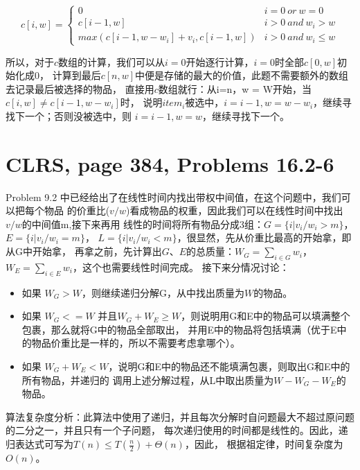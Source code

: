 \documentclass{article}
\begin{document}
\begin{CJK}{UTF8}{gbsn}
\begin{displaymath}
c[i,w] = \left \{ \begin{array}{ll}
                          0 	&i=0 \ or \ w = 0\\
                          c[i-1,w] 		& i > 0 \ and \ w_i > w\\
                          max(c[i-1,w-w_i]+v_i, c[i-1,w]) 	& i > 0 \ and \ w_i \leq w
                  \end{array} \right.
\end{displaymath}

所以，对于$c$数组的计算，我们可以从$i=0$开始逐行计算，$i=0$时全部$c[0,w]$初始化成0，
计算到最后$c[n,w]$中便是存储的最大的价值，此题不需要额外的数组去记录最后被选择的物品，
直接用$c$数组就行：从i=n，w = W开始，当$c[i,w] \neq c[i-1, w - w_i]$时，
说明$item_i$被选中，$i = i-1, w = w-w_i$，继续寻找下一个；否则没被选中，则
$i = i-1, w = w$，继续寻找下一个。

\section{CLRS, page 384, Problems 16.2-6}

Problem 9.2 中已经给出了在线性时间内找出带权中间值，在这个问题中，我们可以把每个物品
的价重比($v/w$)看成物品的权重，因此我们可以在线性时间中找出$v/w$的中间值m,接下来再用
线性的时间将所有物品分成3组：$G = \{ i | v_i/w_i > m\}$，$E = \{ i | v_i/w_i = m\}$，
$L = \{ i | v_i/w_i < m\}$，很显然，先从价重比最高的开始拿，即从G中开始拿，
再拿之前，先计算出$G$、$E$的总质量：$W_G = \sum_{i \in G}w_i$，$W_E = \sum_{i \in
E}w_i$，这个也需要线性时间完成。
接下来分情况讨论：
\begin{itemize}
\item 如果 $W_G > W$，则继续递归分解G，从中找出质量为$W$的物品。
\item 如果 $W_G <= W$ 并且$W_G + W_E \geq
W$，则说明用G和E中的物品可以填满整个包裹，那么就将G中的物品全部取出，
并用E中的物品将包括填满（优于E中的物品价重比是一样的，所以不需要考虑拿哪个）。
\item 如果 $W_G + W_E < W$，说明G和E中的物品还不能填满包裹，则取出G和E中的所有物品，并递归的
调用上述分解过程，从L中取出质量为$W - W_G - W_E$的物品。
\end{itemize}
算法复杂度分析：此算法中使用了递归，并且每次分解时自问题最大不超过原问题的二分之一，并且只有一个子问题，
每次递归使用的时间都是线性的。因此，递归表达式可写为$T(n) \leq T(\frac{n}{2})+\Theta(n)$，因此，
根据祖定律，时间复杂度为$O(n)$。


\end{CJK}
\end{document}
